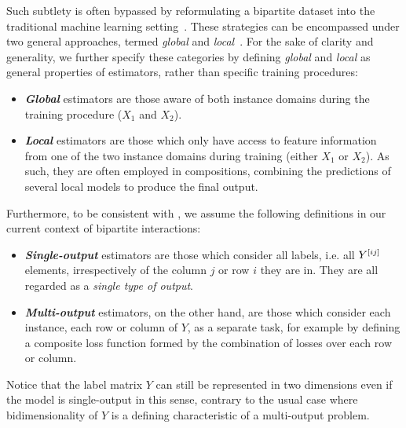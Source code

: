 Such subtlety is often bypassed by reformulating a bipartite dataset into the traditional machine learning setting~\cite{vert2008reconstruction,schrynemackers2015classifying,pahikkala2015more}.
%
These strategies can be encompassed under two general approaches,
termed \emph{global} and \emph{local}~\cite{vert2008reconstruction,lu2011link,pahikkala2014twostep,pliakos2018global,pliakos2020drugtarget}.  %
%
For the sake of clarity and generality, we further specify these categories by defining \emph{global} and \emph{local} as general properties of estimators, rather than specific training procedures:
%
\begin{itemize}
    \item \emph{\textbf{Global}} estimators are those aware of both instance domains during the training procedure ($X_1$ and $X_2$).
    \item \emph{\textbf{Local}} estimators are those which only have access to feature information from one of the two instance domains during training (either $X_1$ or $X_2$).
    As such, they are often employed in compositions, combining the predictions of several local models to produce the final output.
\end{itemize}
%
Furthermore, to be consistent with \cite{schrynemackers2015classifying,pliakos2018global,pliakos2019network,pliakos2020drugtarget}, we assume the following definitions in our current context of bipartite interactions:
%
\begin{itemize}
    \item \emph{\textbf{Single-output}} estimators are those which consider all labels, i.e. all $Y^{[ij]}$ elements, irrespectively of the column $j$ or row $i$ they are in. They are all regarded as a \emph{single type of output}.
    \item \emph{\textbf{Multi-output}} estimators, on the other hand, are those which consider each instance, each row or column of $Y$, as a separate task, for example by defining a composite loss function formed by the combination of losses over each row or column.
\end{itemize}
Notice that the label matrix $Y$ can still be represented in two dimensions even if the model is single-output in this sense, contrary to the usual case where bidimensionality of $Y$ is a defining characteristic of a multi-output problem.


